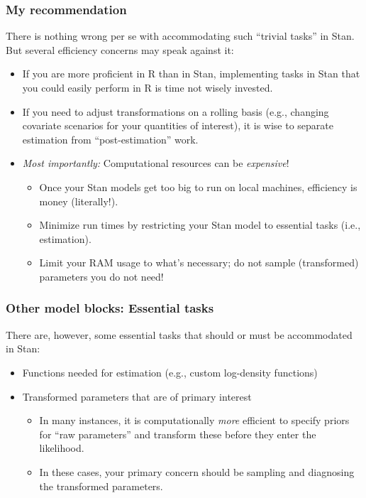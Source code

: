 \documentclass[
  11pt,
]{article}
\providecommand{\tightlist}{%
  \setlength{\itemsep}{0pt}\setlength{\parskip}{0pt}}
\begin{document}
\hypertarget{my-recommendation}{%
\subsubsection{My recommendation}\label{my-recommendation}}

There is nothing wrong per se with accommodating such ``trivial tasks'' in Stan. But several efficiency concerns may speak against it:

\begin{itemize}
\tightlist
\item
  If you are more proficient in R than in Stan, implementing tasks in Stan that you could easily perform in R is time not wisely invested.
\item
  If you need to adjust transformations on a rolling basis (e.g., changing covariate scenarios for your quantities of interest), it is wise to separate estimation from ``post-estimation'' work.
\item
  \emph{Most importantly:} Computational resources can be \emph{expensive}!

  \begin{itemize}
  \tightlist
  \item
    Once your Stan models get too big to run on local machines, efficiency is money (literally!).
  \item
    Minimize run times by restricting your Stan model to essential tasks (i.e., estimation).
  \item
    Limit your RAM usage to what's necessary; do not sample (transformed) parameters you do not need!
  \end{itemize}
\end{itemize}

\hypertarget{other-model-blocks-essential-tasks}{%
\subsubsection{Other model blocks: Essential tasks}\label{other-model-blocks-essential-tasks}}

There are, however, some essential tasks that should or must be accommodated in Stan:

\begin{itemize}
\tightlist
\item
  Functions needed for estimation (e.g., custom log-density functions)
\item
  Transformed parameters that are of primary interest

  \begin{itemize}
  \tightlist
  \item
    In many instances, it is computationally \emph{more} efficient to specify priors for ``raw parameters'' and transform these before they enter the likelihood.
  \item
    In these cases, your primary concern should be sampling and diagnosing the transformed parameters.
  \end{itemize}
\end{itemize}
\end{document}
